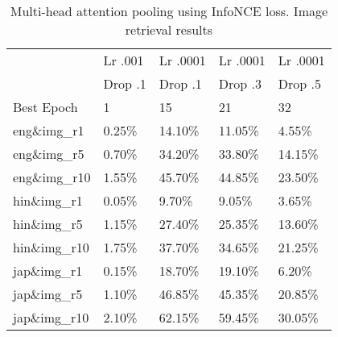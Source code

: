 
\begin{table}
    \centering
\begin{tabular}{lllll}
\toprule
{} & Lr .001 & Lr .0001 & Lr .0001 & Lr .0001 \\
{} & Drop .1 & Drop .1 & Drop .3 & Drop .5 \\
\midrule
Best Epoch          &                          1 &                                  15 &                     21 &                     32 \\
\midrule
eng\&img\_r1  &                      0.25\% &                              14.10\% &                 11.05\% &                  4.55\% \\
eng\&img\_r5  &                      0.70\% &                              34.20\% &                 33.80\% &                 14.15\% \\
eng\&img\_r10 &                      1.55\% &                              45.70\% &                 44.85\% &                 23.50\% \\
\midrule
hin\&img\_r1  &                      0.05\% &                               9.70\% &                  9.05\% &                  3.65\% \\
hin\&img\_r5  &                      1.15\% &                              27.40\% &                 25.35\% &                 13.60\% \\
hin\&img\_r10 &                      1.75\% &                              37.70\% &                 34.65\% &                 21.25\% \\
\midrule
jap\&img\_r1  &                      0.15\% &                              18.70\% &                 19.10\% &                  6.20\% \\
jap\&img\_r5  &                      1.10\% &                              46.85\% &                 45.35\% &                 20.85\% \\
jap\&img\_r10 &                      2.10\% &                              62.15\% &                 59.45\% &                 30.05\% \\

\bottomrule
\end{tabular}

\caption{Multi-head attention pooling using InfoNCE loss. Image retrieval results}
\label{table:mh_attn_hparams_img_ret}
\end{table}
